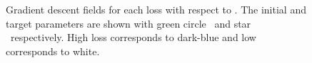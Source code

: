 \begin{figure}[htbp]
    \caption{Gradient descent fields for each loss with respect to \FMMod. The initial and target parameters are shown with green circle \greencircle~and star \greenstar~respectively. High loss corresponds to dark-blue and low corresponds to white.}
    \label{fig:p3_losses}
\end{figure}



